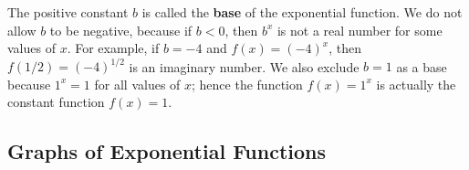 \documentclass[10pt,]{book}
\newcommand{\terminology}[1]{\textbf{#1}}
\theoremstyle{plain}
\theoremstyle{definition}
\theoremstyle{definition}
\theoremstyle{definition}
\theoremstyle{definition}
\theoremstyle{definition}
\numberwithin{equation}{section}
\newcommand{\lt}{ < }
\begin{document}
	The positive constant \(b\) is called the \terminology{base} of the exponential function. We do not allow \(b\) to be negative, because if \(b \lt 0\), then \(b^x\) is not a real number for some values of \(x\). For example, if \(b = −4\) and \(f (x) = (−4)^x\), then \(f (1/2) = (−4)^{1/2}\) is an imaginary number. We also exclude \(b = 1\) as a base because \(1^x = 1\) for all values of \(x\); hence the function \(f (x) = 1^x\) is actually the constant function \(f (x) = 1\).
%
\typeout{************************************************}
\typeout{************************************************}
\subsection[Graphs of Exponential Functions]{Graphs of Exponential Functions}\label{subsection-91}
\end{document}
